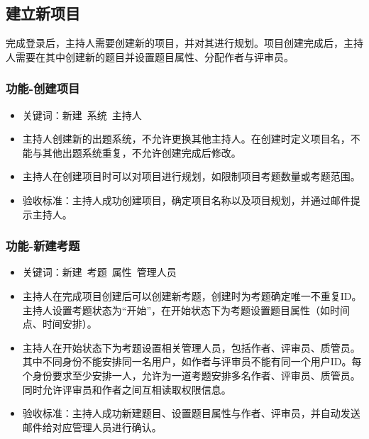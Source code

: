 \documentclass[hyperref, a4paper]{ctexart}
\providecommand{\tightlist}{%
  \setlength{\itemsep}{0pt}\setlength{\parskip}{0pt}}
\begin{document}
\hypertarget{ux5efaux7acbux65b0ux9879ux76ee}{%
\subsection{建立新项目}\label{ux5efaux7acbux65b0ux9879ux76ee}}

完成登录后，主持人需要创建新的项目，并对其进行规划。项目创建完成后，主持人需要在其中创建新的题目并设置题目属性、分配作者与评审员。

\hypertarget{ux529fux80fd-ux521bux5efaux9879ux76ee}{%
\subsubsection{功能-创建项目}\label{ux529fux80fd-ux521bux5efaux9879ux76ee}}

\begin{itemize}
\tightlist
\item
  关键词：新建~系统~主持人
\item
  主持人创建新的出题系统，不允许更换其他主持人。在创建时定义项目名，不能与其他出题系统重复，不允许创建完成后修改。
\item
  主持人在创建项目时可以对项目进行规划，如限制项目考题数量或考题范围。
\item
  验收标准：主持人成功创建项目，确定项目名称以及项目规划，并通过邮件提示主持人。
\end{itemize}

\hypertarget{ux529fux80fd-ux65b0ux5efaux8003ux9898}{%
\subsubsection{功能-新建考题}\label{ux529fux80fd-ux65b0ux5efaux8003ux9898}}

\begin{itemize}
\tightlist
\item
  关键词：新建~考题~属性~管理人员
\item
  主持人在完成项目创建后可以创建新考题，创建时为考题确定唯一不重复ID。主持人设置考题状态为``开始''，在开始状态下为考题设置题目属性（如时间点、时间安排）。
\item
  主持人在开始状态下为考题设置相关管理人员，包括作者、评审员、质管员。其中不同身份不能安排同一名用户，如作者与评审员不能有同一个用户ID。每个身份要求至少安排一人，允许为一道考题安排多名作者、评审员、质管员。同时允许评审员和作者之间互相读取权限信息。
\item
  验收标准：主持人成功新建题目、设置题目属性与作者、评审员，并自动发送邮件给对应管理人员进行确认。
\end{itemize}
\end{document}

